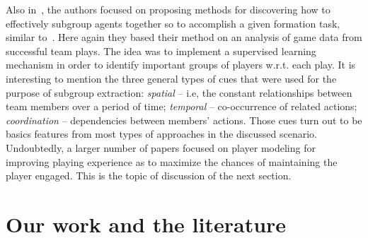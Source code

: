 Also in~\cite{laviersa_using_2014}, the authors focused on proposing methods for discovering how to effectively  subgroup agents together so to accomplish a given formation task, similar to~\cite{stone_task_1999}. Here again they based their method on an analysis of game data from successful team plays. The idea was to implement a supervised learning mechanism in order to identify important groups of players w.r.t. each play. It is interesting to mention the three general types of cues that were used for the purpose of subgroup extraction: \textit{spatial} -- i.e, the constant relationships between team members over a period of time; \textit{temporal} -- co-occurrence of related actions; \textit{coordination} -- dependencies between members' actions. Those cues turn out to be basics features from most types of approaches in the discussed scenario. Undoubtedly, a larger number of papers focused on player modeling for improving playing experience as to maximize the chances of maintaining the player engaged. This is the topic of discussion of the next section.

\section{Our work and the literature}
